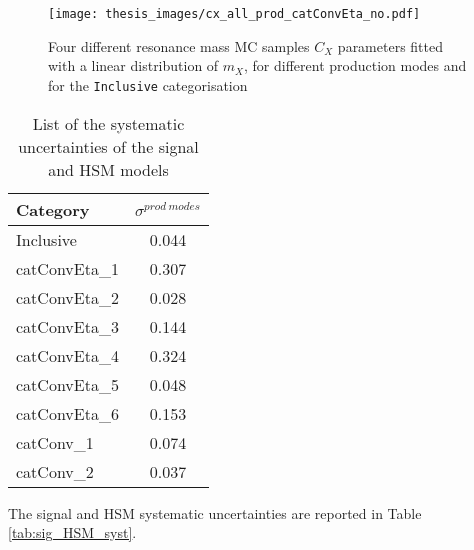 \documentclass[a4paper, oneside, 11pt, openright]{book}
\begin{document}
\begin{itemize}
	 				\begin{figure}
	 					\centering
	 					\texttt{[image: thesis\_images/cx\_all\_prod\_catConvEta\_no.pdf]}
	 					\caption{Four different resonance mass MC samples $C_X$ parameters fitted with a linear distribution of $m_X$, for different production modes and for the \texttt{Inclusive} categorisation}
	 					\label{fig:prod_mode_syst}
	 				\end{figure}
 					\begin{center}
 						\begin{table}[tbp]
 							\centering
 							\begin{tabular}{lc}
 								\toprule[1.5pt]
 								Category		& $\sigma^{prod\ modes}$	\\
 								\midrule
 								Inclusive		& 0.044				\\
 								\midrule
 								catConvEta\_1 	& 0.307				\\
 								catConvEta\_2 	& 0.028				\\
 								catConvEta\_3 	& 0.144				\\
 								catConvEta\_4 	& 0.324				\\
 								catConvEta\_5 	& 0.048				\\
 								catConvEta\_6 	& 0.153				\\
 								\midrule
 								catConv\_1 		& 0.074				\\
 								catConv\_2 		& 0.037				\\
 								\bottomrule[1.5pt]
 							\end{tabular}
 							\caption{List of the systematic uncertainties of the signal and HSM models}
 							\label{tab:prod_mode}
 						\end{table}
 					\end{center}
 				\end{itemize} 
 			\vspace{-2.75cm}
 			The signal and HSM systematic uncertainties are reported in Table \ref{tab:sig_HSM_syst}.
 			
 				
 				
\end{document}
